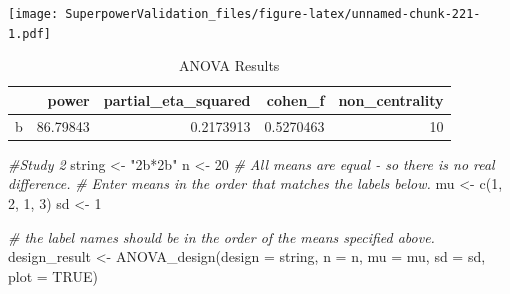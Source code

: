 \documentclass[
]{book}
\newenvironment{Shaded}{\begin{snugshade}}{\end{snugshade}}
\newcommand{\AttributeTok}[1]{\textcolor[rgb]{0.77,0.63,0.00}{#1}}
\newcommand{\CommentTok}[1]{\textcolor[rgb]{0.56,0.35,0.01}{\textit{#1}}}
\newcommand{\ConstantTok}[1]{\textcolor[rgb]{0.00,0.00,0.00}{#1}}
\newcommand{\DecValTok}[1]{\textcolor[rgb]{0.00,0.00,0.81}{#1}}
\newcommand{\FloatTok}[1]{\textcolor[rgb]{0.00,0.00,0.81}{#1}}
\newcommand{\FunctionTok}[1]{\textcolor[rgb]{0.00,0.00,0.00}{#1}}
\newcommand{\NormalTok}[1]{#1}
\newcommand{\OtherTok}[1]{\textcolor[rgb]{0.56,0.35,0.01}{#1}}
\newcommand{\SpecialCharTok}[1]{\textcolor[rgb]{0.00,0.00,0.00}{#1}}
\newcommand{\StringTok}[1]{\textcolor[rgb]{0.31,0.60,0.02}{#1}}
\begin{document}
\texttt{[image: SuperpowerValidation\_files/figure-latex/unnamed-chunk-221-1.pdf]}

\begin{Shaded}
\end{Shaded}

\begin{table}[!h]

\caption{\label{tab:unnamed-chunk-221}ANOVA Results}
\centering
\begin{tabular}[t]{l|r|r|r|r}
\hline
  & power & partial\_eta\_squared & cohen\_f & non\_centrality\\
\hline
b & 86.79843 & 0.2173913 & 0.5270463 & 10\\
\hline
\end{tabular}
\end{table}

\begin{Shaded}
\begin{Highlighting}[]
\CommentTok{\#Study 2}
\NormalTok{string }\OtherTok{\textless{}{-}} \StringTok{"2b*2b"}
\NormalTok{n }\OtherTok{\textless{}{-}} \DecValTok{20}
\CommentTok{\# All means are equal {-} so there is no real difference.}
\CommentTok{\# Enter means in the order that matches the labels below.}
\NormalTok{mu }\OtherTok{\textless{}{-}} \FunctionTok{c}\NormalTok{(}\DecValTok{1}\NormalTok{, }\DecValTok{2}\NormalTok{, }\DecValTok{1}\NormalTok{, }\DecValTok{3}\NormalTok{) }
\NormalTok{sd }\OtherTok{\textless{}{-}} \DecValTok{1}

\CommentTok{\# the label names should be in the order of the means specified above.}
\NormalTok{design\_result }\OtherTok{\textless{}{-}} \FunctionTok{ANOVA\_design}\NormalTok{(}\AttributeTok{design =}\NormalTok{ string,}
                   \AttributeTok{n =}\NormalTok{ n, }
                   \AttributeTok{mu =}\NormalTok{ mu, }
                   \AttributeTok{sd =}\NormalTok{ sd, }
                   \AttributeTok{plot =} \ConstantTok{TRUE}\NormalTok{)}
\end{Highlighting}
\end{Shaded}
\end{document}
